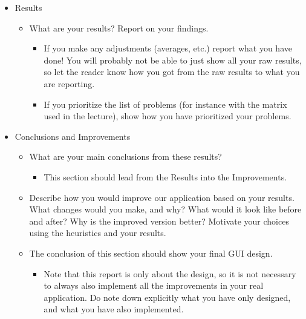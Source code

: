 \documentclass{article}
\begin{document}
\begin{itemize}
\item Results
    \begin{itemize}
        \item What are your results? Report on your findings.
        \begin{itemize}
            \item If you make any adjustments (averages, etc.) report what you have done! You will probably not be able to just show all your raw results, so let the reader know how you got from the raw results to what you are reporting.
            \item If you prioritize the list of problems (for instance with the matrix used in the lecture), show how you have prioritized your problems.
        \end{itemize}
    \end{itemize}
\item Conclusions and Improvements
    \begin{itemize}
        \item What are your main conclusions from these results?
        \begin{itemize}
            \item This section should lead from the Results into the Improvements.
        \end{itemize}
        \item Describe how you would improve our application based on your results. What changes would you make, and why? What would it look like before and after? Why is the improved version better? Motivate your choices using the heuristics and your results.
        \item The conclusion of this section should show your final GUI design.
        \begin{itemize}
            \item Note that this report is only about the design, so it is not necessary to always also implement all the improvements in your real application. Do note down explicitly what you have only designed, and what you have also implemented.
        \end{itemize}
    \end{itemize}
\end{itemize}




\end{document}

